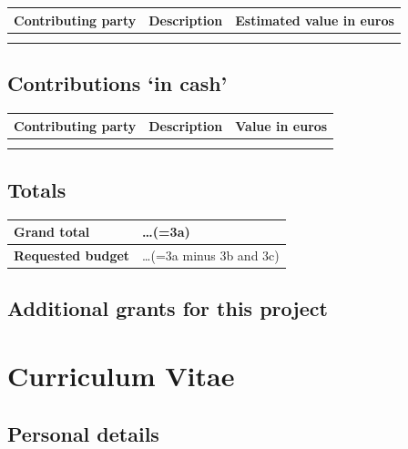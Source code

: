 \documentclass[10pt]{article}
\newcommand{\tableheadfont}{\bfseries\fontsize{10}{10}\selectfont\leavevmode\color{tableblue}}
\begin{document}
	{\renewcommand{\arraystretch}{1.5}
	\begin{tabularx}{\linewidth}{|X|X|X|}
		\arrayrulecolor[gray]{0.4}\hline
		\rowcolor[gray]{0.8} {\tableheadfont Contributing party} & {\tableheadfont Description } & {\tableheadfont Estimated value in euros} \\\hline 
	 & & \\\hline
	 & & \\\hline
	\end{tabularx}
	}

	\subsection{Contributions `in cash'}

	{\renewcommand{\arraystretch}{1.5}
	\begin{tabularx}{\linewidth}{|X|X|X|}
		\arrayrulecolor[gray]{0.4}\hline
		\rowcolor[gray]{0.8} {\tableheadfont Contributing party} & {\tableheadfont Description } & {\tableheadfont Value in euros} \\\hline 
		& & \\\hline
		& & \\\hline
	\end{tabularx}
	}
	
	\subsection{Totals}
	{\renewcommand{\arraystretch}{1.5}
	\begin{tabularx}{\linewidth}{|p{3cm}|X|}
		\arrayrulecolor[gray]{0.4}\hline
		{\cellcolor[gray]{0.8}\tableheadfont Grand total} & \ldots\quad (=3a) \\\hline 
		{\cellcolor[gray]{0.8}\tableheadfont Requested budget} & \ldots\quad (=3a minus 3b and 3c) \\\hline 
	\end{tabularx}
	}

	\subsection{Additional grants for this project}
	
	\section{Curriculum Vitae}
	
	\subsection{Personal details}
	
\end{document}
